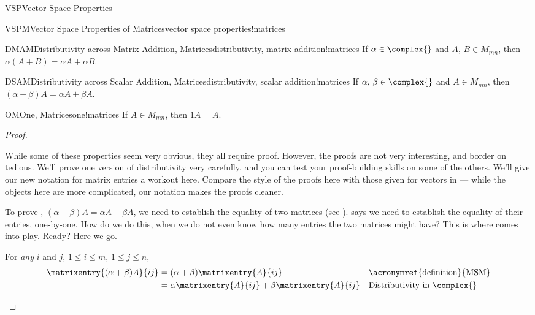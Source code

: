 \begin{subsect}{VSP}{Vector Space Properties}
\begin{theorem}{VSPM}{Vector Space Properties of Matrices}{vector space properties!matrices}
\begin{para}
\begin{propertylist}
%
\begin{property}{DMAM}{Distributivity across Matrix Addition, Matrices}{distributivity, matrix addition!matrices}
If $\alpha\in\complex{\null}$ and $A,\,B\in M_{mn}$, then $\alpha(A+B)=\alpha A+\alpha B$.\end{property}
%
\begin{property}{DSAM}{Distributivity across Scalar Addition, Matrices}{distributivity, scalar addition!matrices}
If $\alpha,\,\beta\in\complex{\null}$ and $A\in M_{mn}$, then
$(\alpha+\beta)A=\alpha A+\beta A$.\end{property}
%
\begin{property}{OM}{One, Matrices}{one!matrices}
If $A\in M_{mn}$, then $1A=A$.\end{property}
%
\end{propertylist}
\end{para}
\end{theorem}
%
\begin{proof}
\begin{para}While some of these properties seem very obvious, they all require proof.  However, the proofs are not very interesting, and border on tedious. We'll prove one version of distributivity very carefully, and you can test your proof-building skills on some of the others.  We'll give our new notation for matrix entries a workout here.  Compare the style of the proofs here with those given for vectors in  --- while the objects here are more complicated, our notation makes the proofs cleaner.\end{para}
%
\begin{para}To prove ,  $(\alpha+\beta)A=\alpha A+\beta A$, we need to establish the equality of two matrices (see ).   says we need to establish the equality of their entries, one-by-one.  How do we do this, when we do not even know how many entries the two matrices might have?  This is where  comes into play.  Ready?  Here we go.\end{para}
%
\begin{para}For {\em any} $i$ and $j$, $1\leq i\leq m$, $1\leq j\leq n$,
%
\begin{align*}
\matrixentry{(\alpha+\beta)A}{ij}&=
(\alpha+\beta)\matrixentry{A}{ij}&&\text{\acronymref{definition}{MSM}}\\
&=\alpha\matrixentry{A}{ij}+\beta\matrixentry{A}{ij}&&\text{Distributivity in $\complex{\null}$}\\

\end{align*}
\end{para}
\end{proof}
\end{subsect}
